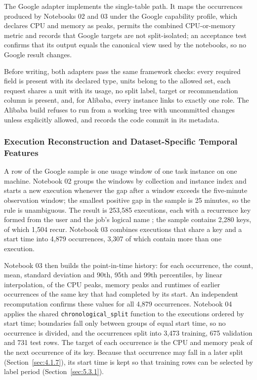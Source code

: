 The Google adapter implements the single-table path. It maps the occurrences produced by Notebooks 02 and 03 under the Google capability profile, which declares CPU and memory as peaks, permits the combined CPU-or-memory metric and records that Google targets are not split-isolated; an acceptance test confirms that its output equals the canonical view used by the notebooks, so no Google result changes.

Before writing, both adapters pass the same framework checks: every required field is present with its declared type, units belong to the allowed set, each request shares a unit with its usage, no split label, target or recommendation column is present, and, for Alibaba, every instance links to exactly one role. The Alibaba build refuses to run from a working tree with uncommitted changes unless explicitly allowed, and records the code commit in its metadata.

\subsubsection{Execution Reconstruction and Dataset-Specific Temporal Features}\label{sec:5.1.2}

A row of the Google sample is one usage window of one task instance on one machine. Notebook 02 groups the windows by collection and instance index and starts a new execution whenever the gap after a window exceeds the five-minute observation window; the smallest positive gap in the sample is 25 minutes, so the rule is unambiguous. The result is 253,585 executions, each with a recurrence key formed from the user and the job's logical name \cite{ref7}; the sample contains 2,280 keys, of which 1,504 recur. Notebook 03 combines executions that share a key and a start time into 4,879 occurrences, 3,307 of which contain more than one execution.

Notebook 03 then builds the point-in-time history: for each occurrence, the count, mean, standard deviation and 90th, 95th and 99th percentiles, by linear interpolation, of the CPU peaks, memory peaks and runtimes of earlier occurrences of the same key that had completed by its start. An independent recomputation confirms these values for all 4,879 occurrences. Notebook 04 applies the shared \texttt{chronological\_split} function to the executions ordered by start time; boundaries fall only between groups of equal start time, so no occurrence is divided, and the occurrences split into 3,473 training, 675 validation and 731 test rows. The target of each occurrence is the CPU and memory peak of the next occurrence of its key. Because that occurrence may fall in a later split (Section~\ref{sec:4.1.7}), its start time is kept so that training rows can be selected by label period (Section~\ref{sec:5.3.1}).

